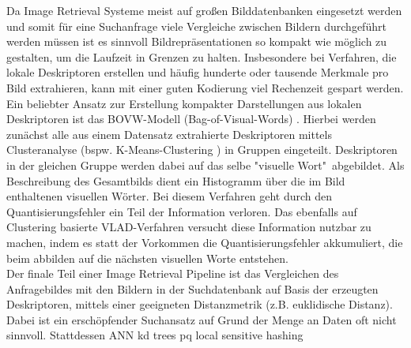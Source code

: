 Da Image Retrieval Systeme meist auf großen Bilddatenbanken eingesetzt werden und somit für eine Suchanfrage viele Vergleiche zwischen Bildern durchgeführt werden müssen ist es sinnvoll Bildrepräsentationen so kompakt wie möglich zu gestalten, um die Laufzeit in Grenzen zu halten. Insbesondere bei Verfahren, die lokale Deskriptoren erstellen und häufig hunderte oder tausende Merkmale pro Bild extrahieren, kann mit einer guten Kodierung viel Rechenzeit gespart werden. Ein beliebter Ansatz zur Erstellung kompakter Darstellungen aus lokalen Deskriptoren ist das BOVW-Modell (Bag-of-Visual-Words) \cite{bow}. Hierbei werden zunächst alle aus einem Datensatz extrahierte Deskriptoren mittels Clusteranalyse (bspw. K-Means-Clustering \cite{k_means}) in Gruppen eingeteilt. Deskriptoren in der gleichen Gruppe werden dabei auf das selbe "visuelle Wort"\ abgebildet. Als Beschreibung des Gesamtbilds dient ein Histogramm über die im Bild enthaltenen visuellen Wörter. Bei diesem Verfahren geht durch den Quantisierungsfehler ein Teil der Information verloren. Das ebenfalls auf Clustering basierte VLAD-Verfahren \cite{vlad} versucht diese Information nutzbar zu machen, indem es statt der Vorkommen die Quantisierungsfehler akkumuliert, die beim abbilden auf die nächsten visuellen Worte entstehen. \\
Der finale Teil einer Image Retrieval Pipeline ist das Vergleichen des Anfragebildes mit den Bildern in der Suchdatenbank auf Basis der erzeugten Deskriptoren, mittels einer geeigneten Distanzmetrik (z.B. euklidische Distanz). Dabei ist ein erschöpfender Suchansatz auf Grund der Menge an Daten oft nicht sinnvoll. Stattdessen 
ANN kd trees pq local sensitive hashing
